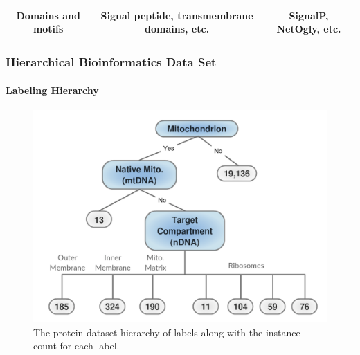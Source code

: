 \documentclass{beamer}
\begin{document}
\begin{frame}
\begin{table}[H]
{\begin{tabular}{|c|c|c|}
\parbox{0.3\linewidth}{\raggedright Domains and motifs} & \parbox{0.45\linewidth}{\raggedright \vspace{1ex}Signal peptide, transmembrane domains, etc.\vspace{1ex}} & \parbox{0.3\linewidth}{\raggedright SignalP, NetOgly, etc.} \\ \hline
      \end{tabular} }
    \end{table}
\end{frame}
\begin{frame}
    \frametitle{Hierarchical Bioinformatics Data Set}
    \framesubtitle{Labeling Hierarchy}
    \begin{figure}[!htb]
        \centering
    \includegraphics[width=0.75\columnwidth]{fig/MitoTreeLabels}
        \caption{The protein dataset hierarchy of labels along with the instance
        count for each label.}
        \label{fig:Mitotree}
    \end{figure}
\end{frame}
\end{document}
